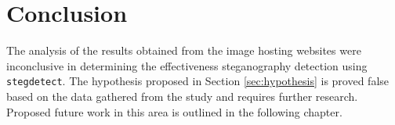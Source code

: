 \chapter{Conclusion}
\label{ch:conclusion}
The analysis of the results obtained from the image hosting websites
were inconclusive in determining the effectiveness steganography
detection using \texttt{stegdetect}. The hypothesis proposed in Section
\ref{sec:hypothesis} is proved false based on the data gathered from the
study and requires further research. Proposed future work in this area
is outlined in the following chapter.
